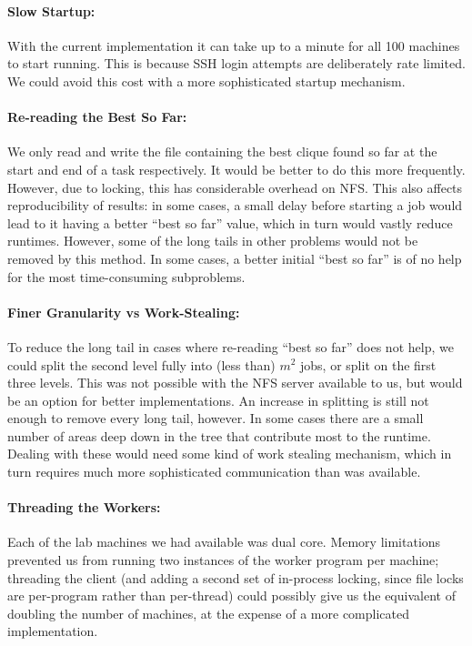 \documentclass{l4proj}
\begin{document}
\paragraph{Slow Startup:}
With the current implementation it can take up to a minute for all 100 machines
to start running. This is because SSH login attempts are deliberately rate
limited. We could avoid this cost with a more sophisticated startup mechanism.

\paragraph{Re-reading the Best So Far:}
We only read and write the file containing the best clique found so far at the
start and end of a task respectively. It would be better to do this more
frequently. However, due to locking, this has considerable overhead on NFS.
This also affects reproducibility of results: in some cases, a small delay
before starting a job would lead to it having a better ``best so far'' value,
which in turn would vastly reduce runtimes. 
However, some of the long tails in other problems would not be removed by this
method. In some cases, a better initial ``best so far'' is of no help for the
most time-consuming subproblems.

\paragraph{Finer Granularity vs Work-Stealing:}
To reduce the long tail in cases where re-reading ``best so far'' does not
help, we could split the second level fully into (less than) $m^2$ jobs, or
split on the first three levels. This was not possible with the NFS server
available to us, but would be an option for better implementations.
An increase in splitting is still not enough to remove every long tail,
however. In some cases there are a small number of areas deep down in the tree
that contribute most to the runtime. Dealing with these would need some kind of
work stealing mechanism, which in turn requires much more sophisticated
communication than was available.

\paragraph{Threading the Workers:}
Each of the lab machines we had available was dual core. Memory limitations
prevented us from running two instances of the worker program per machine;
threading the client (and adding a second set of in-process locking, since file
locks are per-program rather than per-thread) could possibly give us the
equivalent of doubling the number of machines, at the expense of a more
complicated implementation.
\end{document}

